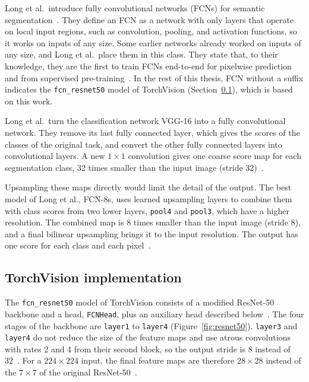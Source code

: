 Long et al.\ introduce fully convolutional networks (FCNs) for semantic segmentation~\cite{long2015fcn,geron2026handson}. They define an FCN as a network with only layers that operate on local input regions, such as convolution, pooling, and activation functions, so it works on inputs of any size. Some earlier networks already worked on inputs of any size, and Long et al.\ place them in this class. They state that, to their knowledge, they are the first to train FCNs end-to-end for pixelwise prediction and from supervised pre-training~\cite{long2015fcn}. In the rest of this thesis, FCN without a suffix indicates the \texttt{fcn\_resnet50} model of TorchVision (Section~\ref{subsec:fcn_torchvision}), which is based on this work.

Long et al.\ turn the classification network VGG-16 into a fully convolutional network. They remove its last fully connected layer, which gives the scores of the classes of the original task, and convert the other fully connected layers into convolutional layers. A new $1\times1$ convolution gives one coarse score map for each segmentation class, 32 times smaller than the input image (stride 32)~\cite{long2015fcn}.

Upsampling these maps directly would limit the detail of the output. The best model of Long et al., FCN-8s, uses learned upsampling layers to combine them with class scores from two lower layers, \texttt{pool4} and \texttt{pool3}, which have a higher resolution. The combined map is 8 times smaller than the input image (stride 8), and a final bilinear upsampling brings it to the input resolution. The output has one score for each class and each pixel~\cite{long2015fcn}.

\subsection{TorchVision implementation}
\label{subsec:fcn_torchvision}

The \texttt{fcn\_resnet50} model of TorchVision consists of a modified ResNet-50 backbone and a head, \texttt{FCNHead}, plus an auxiliary head described below~\cite{torchvision_fcn}. The four stages of the backbone are \texttt{layer1} to \texttt{layer4} (Figure~\ref{fig:resnet50}). \texttt{layer3} and \texttt{layer4} do not reduce the size of the feature maps and use atrous convolutions with rates 2 and 4 from their second block, so the output stride is 8 instead of 32~\cite{torchvision_fcn,torchvision_resnet}. For a $224\times224$ input, the final feature maps are therefore $28\times28$ instead of the $7\times7$ of the original ResNet-50~\cite{he2016deep}.

